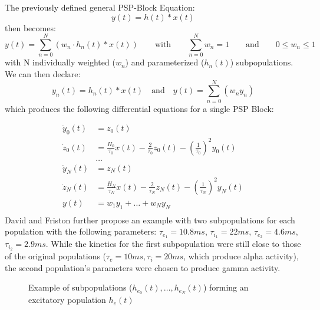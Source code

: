 The previously defined general PSP-Block Equation:
\[y(t)=h(t)\ast x(t)\]
then becomes:
\[y(t)=\sum_{n=0}^{N}{(w_n \cdot h_n(t) \ast x(t))} \hspace{2em}
\text{with}
\hspace{2em} \sum_{n=0}^{N}w_n = 1 \hspace{2em}
\text{and}
\hspace{2em} 0 \leq w_n \leq 1\]
with N individually weighted ($w_n$) and parameterized ($h_n(t)$) subpopulations. \\
We can then declare:
\[y_n(t) = h_n(t) \ast x(t) \quad \text{and} \quad y(t) = \sum_{n=0}^{N} (w_{n}y_n)\]
which produces the following differential equations for a single PSP Block:

\begin{equation}
    \begin{aligned}
        \dot{y}_0(t) &= z_0(t) \\
        \dot{z}_0(t) &= \frac{H_0}{\tau_0} x(t) - \frac{2}{\tau_0}z_0(t) - \left(\frac{1}{\tau_0}\right)^{2}y_0(t)\\
        &\dots\\
        \dot{y}_N(t) &= z_N(t) \\
        \dot{z}_N(t) &= \frac{H_N}{\tau_N} x(t) - \frac{2}{\tau_N}z_N(t) - \left(\frac{1}{\tau_N}\right)^{2}y_N(t)\\
        y(t)         &= w_{1}y_1 + \dots + w_{N}y_N\\
    \end{aligned}\label{eq:davidfriston_subpops}
\end{equation}
David and Friston further propose an example with two subpopulations for each population with
the following parameters: $\tau_{e_1}=10.8ms$, $\tau_{i_1}=22ms$, $\tau_{e_2}=4.6ms$, $\tau_{i_2}=2.9ms$.
While the kinetics for the first subpopulation were still close
to those of the original populations ($\tau_e=10ms, \tau_i=20ms$, which produce alpha activity),
the second population's parameters were chosen to produce gamma activity.


\begin{figure}[H]
    
    \caption{Example of subpopulations ($h_{e_0}(t), \dots, h_{e_N}(t)$) forming an excitatory population $h_e(t)$}
    \label{fig:exc_subpops}
\end{figure}
%


